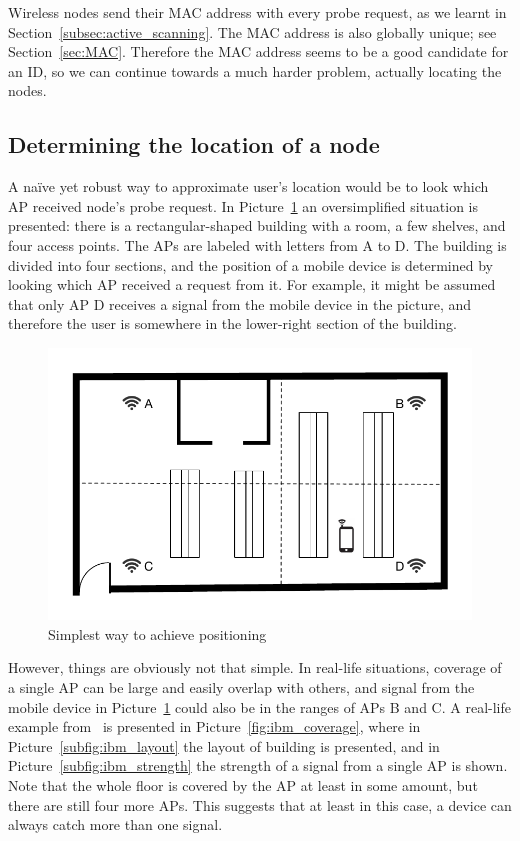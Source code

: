 \documentclass[12pt,a4paper,oneside,pdftex]{report}
\begin{document}
Wireless nodes send their MAC address with every probe request, as we learnt in Section~\ref{subsec:active_scanning}. The MAC address is also globally unique; see Section~\ref{sec:MAC}. Therefore the MAC address seems to be a good candidate for an ID, so we can continue towards a much harder problem, actually locating the nodes.

\subsection{Determining the location of a node}
\label{sec:location}

A na{\"i}ve yet robust way to approximate user's location would be to look which AP received node's probe request. In Picture~\ref{fig:position_1} an oversimplified situation is presented: there is a rectangular-shaped building with a room, a few shelves, and four access points. The APs are labeled with letters from A to D. The building is divided into four sections, and the position of a mobile device is determined by looking which AP received a request from it. For example, it might be assumed that only AP D receives a signal from the mobile device in the picture, and therefore the user is somewhere in the lower-right section of the building.

\begin{figure}
    \label{fig:position_1}
    \includegraphics{images/positioning_1.pdf}
    \caption{Simplest way to achieve positioning}
\end{figure}

However, things are obviously not that simple. In real-life situations, coverage of a single AP can be large and easily overlap with others, and signal from the mobile device in Picture~\ref{fig:position_1} could also be in the ranges of APs B and C. A real-life example from~\cite{xiang2004} is presented in Picture~\ref{fig:ibm_coverage}, where in Picture~\ref{subfig:ibm_layout} the layout of building is presented, and in Picture~\ref{subfig:ibm_strength} the strength of a signal from a single AP is shown. Note that the whole floor is covered by the AP at least in some amount, but there are still four more APs. This suggests that at least in this case, a device can always catch more than one signal.
\end{document}
